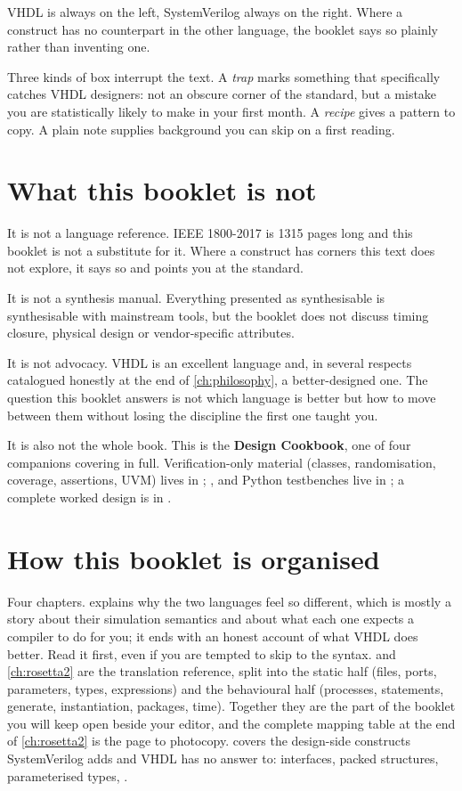 VHDL is always on the left, SystemVerilog always on the right. Where a
construct has no counterpart in the other language, the booklet says so
plainly rather than inventing one.

Three kinds of box interrupt the text. A \emph{trap} marks something that
specifically catches VHDL designers: not an obscure corner of the standard, but
a mistake you are statistically likely to make in your first month. A
\emph{recipe} gives a pattern to copy. A plain note supplies background you can
skip on a first reading.

\section*{What this booklet is not}

It is not a language reference. IEEE 1800-2017 is 1315 pages long and this
booklet is not a substitute for it. Where a construct has corners this text
does not explore, it says so and points you at the standard.

It is not a synthesis manual. Everything presented as synthesisable is
synthesisable with mainstream tools, but the booklet does not discuss timing
closure, physical design or vendor-specific attributes.

It is not advocacy. VHDL is an excellent language and, in several respects
catalogued honestly at the end of \cref{ch:philosophy}, a better-designed one.
The question this booklet answers is not which language is better but how to
move between them without losing the discipline the first one taught you.

It is also not the whole book. This is the \textbf{Design Cookbook}, one of
four companions covering  in full.
Verification-only material (classes, randomisation, coverage, assertions,
UVM) lives in ; ,  and
Python testbenches live in ; a complete worked design is
in .

\section*{How this booklet is organised}

Four chapters.  explains why the two languages feel so
different, which is mostly a story about their simulation semantics and about
what each one expects a compiler to do for you; it ends with an honest account
of what VHDL does better. Read it first, even if you are tempted to skip to
the syntax.  and \cref{ch:rosetta2} are the translation
reference, split into the static half (files, ports, parameters, types,
expressions) and the behavioural half (processes, statements, generate,
instantiation, packages, time). Together they are the part of the booklet you
will keep open beside your editor, and the complete mapping table at the end
of \cref{ch:rosetta2} is the page to photocopy.  covers the
design-side constructs SystemVerilog adds and VHDL has no answer to:
interfaces, packed structures, parameterised types, .


